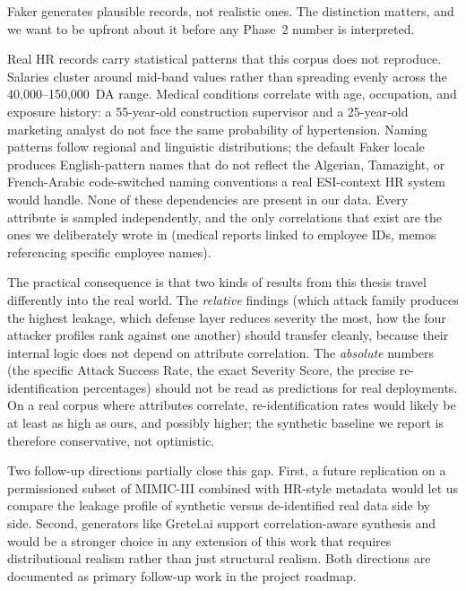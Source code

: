 \documentclass[12pt, a4paper]{article}
\begin{document}
Faker generates plausible records, not realistic ones. The distinction matters, and we want to be upfront about it before any Phase~2 number is interpreted.

Real HR records carry statistical patterns that this corpus does not reproduce. Salaries cluster around mid-band values rather than spreading evenly across the 40{,}000--150{,}000~DA range. Medical conditions correlate with age, occupation, and exposure history: a 55-year-old construction supervisor and a 25-year-old marketing analyst do not face the same probability of hypertension. Naming patterns follow regional and linguistic distributions; the default Faker locale produces English-pattern names that do not reflect the Algerian, Tamazight, or French-Arabic code-switched naming conventions a real ESI-context HR system would handle. None of these dependencies are present in our data. Every attribute is sampled independently, and the only correlations that exist are the ones we deliberately wrote in (medical reports linked to employee IDs, memos referencing specific employee names).

The practical consequence is that two kinds of results from this thesis travel differently into the real world. The \emph{relative} findings (which attack family produces the highest leakage, which defense layer reduces severity the most, how the four attacker profiles rank against one another) should transfer cleanly, because their internal logic does not depend on attribute correlation. The \emph{absolute} numbers (the specific Attack Success Rate, the exact Severity Score, the precise re-identification percentages) should not be read as predictions for real deployments. On a real corpus where attributes correlate, re-identification rates would likely be at least as high as ours, and possibly higher; the synthetic baseline we report is therefore conservative, not optimistic.

Two follow-up directions partially close this gap. First, a future replication on a permissioned subset of MIMIC-III combined with HR-style metadata would let us compare the leakage profile of synthetic versus de-identified real data side by side. Second, generators like Gretel.ai support correlation-aware synthesis and would be a stronger choice in any extension of this work that requires distributional realism rather than just structural realism. Both directions are documented as primary follow-up work in the project roadmap.



\end{document}
